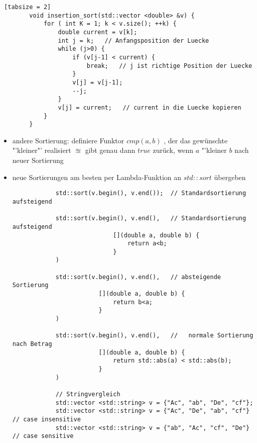 \documentclass{article}
\begin{document}
	\begin{lstlisting} [tabsize = 2]
		void insertion_sort(std::vector <double> &v) {
			for ( int K = 1; k < v.size(); ++k) {
				double current = v[k];
				int j = k;   // Anfangsposition der Luecke
				while (j>0) {
					if (v[j-1] < current) {
						break;   // j ist richtige Position der Luecke
					}
					v[j] = v[j-1];
					--j;
				}
				v[j] = current;   // current in die Luecke kopieren
			}
		}
	\end{lstlisting}
	\begin{itemize}
		\item andere Sortierung: definiere Funktor $cmp(a,b)$ , der das gewünschte "'kleiner"' realisiert $\approxeq$ gibt genau dann $true$ zurück, wenn $a$ "'kleiner $b$ nach neuer Sortierung
		\item neue Sortierungen am besten per Lambda-Funktion an $std::sort$ übergeben
		\begin{lstlisting}
			std::sort(v.begin(), v.end());  // Standardsortierung aufsteigend
			
			std::sort(v.begin(), v.end(),   // Standardsortierung aufsteigend
							[](double a, double b) {
								return a<b;
							}
			)
			
			std::sort(v.begin(), v.end(),   // absteigende Sortierung
						[](double a, double b) {
							return b<a;
						}
			)
						
			std::sort(v.begin(), v.end(),   //   normale Sortierung nach Betrag
						[](double a, double b) {
							return std::abs(a) < std::abs(b);
						}
			)
			
			// Stringvergleich 
			std::vector <std::string> v = {"Ac", "ab", "De", "cf"};  
			std::vector <std::string> v = {"Ac", "De", "ab", "cf"}  // case insensitive
			std::vector <std::string> v = {"ab", "Ac", "cf", "De"}  // case sensitive
			
		\end{lstlisting}
	\end{itemize}
\end{document}
